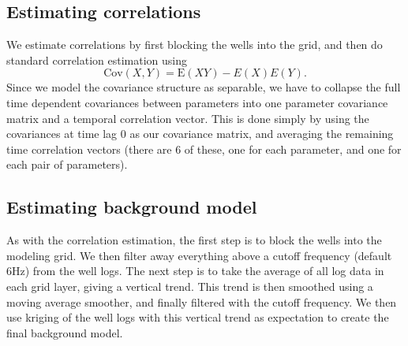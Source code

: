 \subsection{Estimating correlations}
\label{sec:correstimp}
We estimate correlations by first blocking the wells into the grid, and then do standard correlation estimation using
\begin{equation}
\text{Cov}(X,Y) = \text{E}(XY)-E(X)E(Y).
\end{equation}
Since we model the covariance structure as separable, we have to collapse the full time dependent covariances between parameters into one parameter covariance matrix and a temporal correlation vector. This is done simply by using the covariances at time lag 0 as our covariance matrix, and averaging the remaining time correlation vectors (there are 6 of these, one for each parameter, and one for each pair of parameters).

\subsection{Estimating background model}
As with the correlation estimation, the first step is to block the wells into the modeling grid. We then filter away everything above a cutoff frequency (default 6Hz) from the well logs. The next step is to take the average of all log data in each grid layer, giving a vertical trend. This trend is then smoothed using a moving average smoother, and finally filtered with the cutoff frequency. We then use kriging of the well logs with this vertical trend as expectation to create the final background model.

